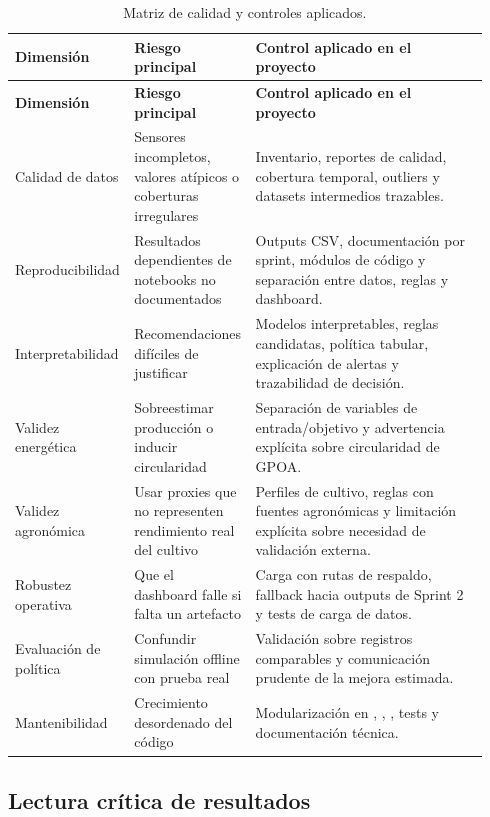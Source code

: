﻿\documentclass[11pt,a4paper]{article}
\newcommand{\code}[1]{\colorbox{lightbg}{\texttt{\small\detokenize{#1}}}}
\begin{document}
\begin{longtable}{p{0.20\linewidth}p{0.25\linewidth}p{0.49\linewidth}}
\caption{Matriz de calidad y controles aplicados.}\\
\toprule
\textbf{Dimensión} & \textbf{Riesgo principal} & \textbf{Control aplicado en el proyecto} \\
\midrule
\endfirsthead
\toprule
\textbf{Dimensión} & \textbf{Riesgo principal} & \textbf{Control aplicado en el proyecto} \\
\midrule
\endhead
Calidad de datos & Sensores incompletos, valores atípicos o coberturas irregulares & Inventario, reportes de calidad, cobertura temporal, outliers y datasets intermedios trazables. \\ \addlinespace
Reproducibilidad & Resultados dependientes de notebooks no documentados & Outputs CSV, documentación por sprint, módulos de código y separación entre datos, reglas y dashboard. \\ \addlinespace
Interpretabilidad & Recomendaciones difíciles de justificar & Modelos interpretables, reglas candidatas, política tabular, explicación de alertas y trazabilidad de decisión. \\ \addlinespace
Validez energética & Sobreestimar producción o inducir circularidad & Separación de variables de entrada/objetivo y advertencia explícita sobre circularidad de GPOA. \\ \addlinespace
Validez agronómica & Usar proxies que no representen rendimiento real del cultivo & Perfiles de cultivo, reglas con fuentes agronómicas y limitación explícita sobre necesidad de validación externa. \\ \addlinespace
Robustez operativa & Que el dashboard falle si falta un artefacto & Carga con rutas de respaldo, fallback hacia outputs de Sprint 2 y tests de carga de datos. \\ \addlinespace
Evaluación de política & Confundir simulación offline con prueba real & Validación sobre registros comparables y comunicación prudente de la mejora estimada. \\ \addlinespace
Mantenibilidad & Crecimiento desordenado del código & Modularización en \code{src/}, \code{tabs/}, \code{core/}, tests y documentación técnica. \\
\bottomrule
\end{longtable}

\subsection{Lectura crítica de resultados}
\end{document}
